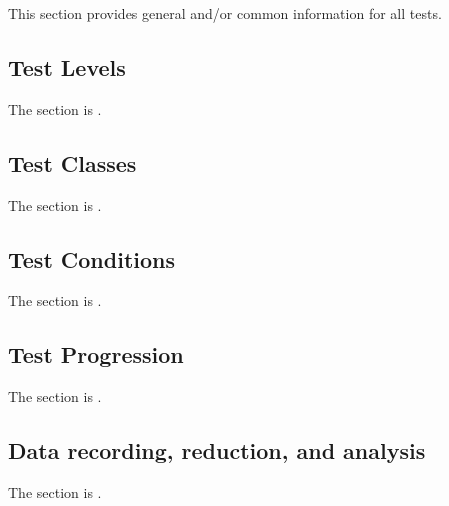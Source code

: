 


This section provides general and/or common information for all tests.

\subsection{Test Levels}
\label{loc:TestLevels}

The section is \TBD.

\subsection{Test Classes}
\label{loc:TestClasses}

The section is \TBD.


\subsection{Test Conditions}
\label{loc:TestConditions}

The section is \TBD.


\subsection{Test Progression}
\label{loc:TestProgression}

The section is \TBD.

\subsection{Data recording, reduction, and analysis}
\label{loc:DataRecordingReductionAndAnalysis}

The section is \TBD.